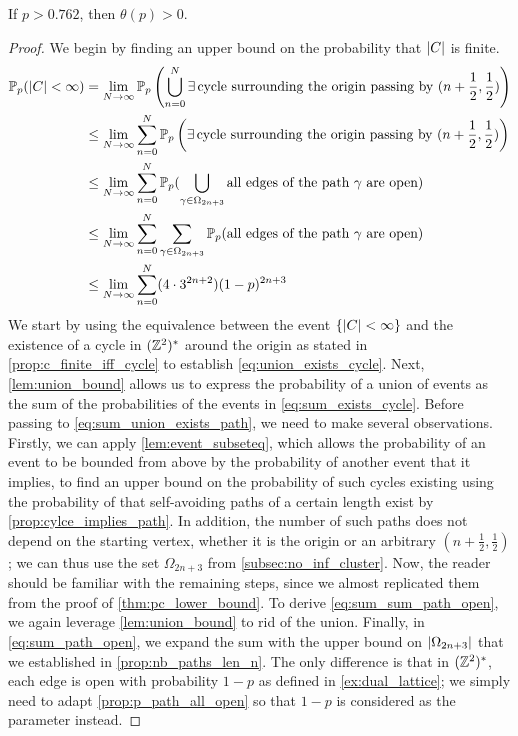 \documentclass[a4paper, 12pt]{article}
\begin{document}
\begin{thm}\label{thm:pc_higher_bound}
If $p > 0.762$, then $\theta(p) > 0$.
\end{thm}
\begin{proof}
We begin by finding an upper bound on the probability that $\lvert C \rvert$ is finite.
\begin{align}
    \mathbb{P}_p(\lvert C \rvert < \infty)
    &= \lim_{N \to \infty} \mathbb{P}_p\left(\bigcup_{n = 0}^N \exists\,\text{cycle surrounding the origin passing by } (n + \frac{1}{2}, \frac{1}{2})\right)\label{eq:union_exists_cycle}\\
    &\leq \lim_{N \to \infty} \sum_{n = 0}^N \mathbb{P}_p\left(\exists\,\text{cycle surrounding the origin passing by } (n + \frac{1}{2}, \frac{1}{2})\right)\label{eq:sum_exists_cycle}\\
    &\leq \lim_{N \to \infty} \sum_{n = 0}^N \mathbb{P}_p(\bigcup_{\gamma \in \Omega_{2n + 3}} \text{all edges of the path } \gamma \text{ are open})\label{eq:sum_union_exists_path}\\
    &\leq \lim_{N \to \infty} \sum_{n = 0}^N \sum_{\gamma \in \Omega_{2n + 3}} \mathbb{P}_p(\text{all edges of the path } \gamma \text{ are open})\label{eq:sum_sum_path_open}\\
    &\leq \lim_{N \to \infty} \sum_{n = 0}^N (4 \cdot 3^{2n + 2}) (1 - p)^{2n + 3}\label{eq:sum_path_open}
\end{align}
We start by using the equivalence between the event $\{\lvert C \rvert < \infty\}$ and the existence of a cycle in $(\mathbb{Z}^2)^*$ around the origin as stated in \cref{prop:c_finite_iff_cycle} to establish \cref{eq:union_exists_cycle}. Next, \cref{lem:union_bound} allows us to express the probability of a union of events as the sum of the probabilities of the events in \cref{eq:sum_exists_cycle}. Before passing to \cref{eq:sum_union_exists_path}, we need to make several observations. Firstly, we can apply \cref{lem:event_subseteq}, which allows the probability of an event to be bounded from above by the probability of another event that it implies, to find an upper bound on the probability of such cycles existing using the probability of that self-avoiding paths of a certain length exist by \cref{prop:cylce_implies_path}. In addition, the number of such paths does not depend on the starting vertex, whether it is the origin or an arbitrary $(n + \frac{1}{2}, \frac{1}{2})$; we can thus use the set $\Omega_{2n + 3}$ from \cref{subsec:no_inf_cluster}. Now, the reader should be familiar with the remaining steps, since we almost replicated them from the proof of \cref{thm:pc_lower_bound}. To derive \cref{eq:sum_sum_path_open}, we again leverage \cref{lem:union_bound} to rid of the union. Finally, in \cref{eq:sum_path_open}, we expand the sum with the upper bound on $\lvert \Omega_{2n + 3} \rvert$ that we established in \cref{prop:nb_paths_len_n}. The only difference is that in $(\mathbb{Z}^2)^*$, each edge is open with probability $1 - p$ as defined in \cref{ex:dual_lattice}; we simply need to adapt \cref{prop:p_path_all_open} so that $1 - p$ is considered as the parameter instead.


\end{proof}
\end{document}
